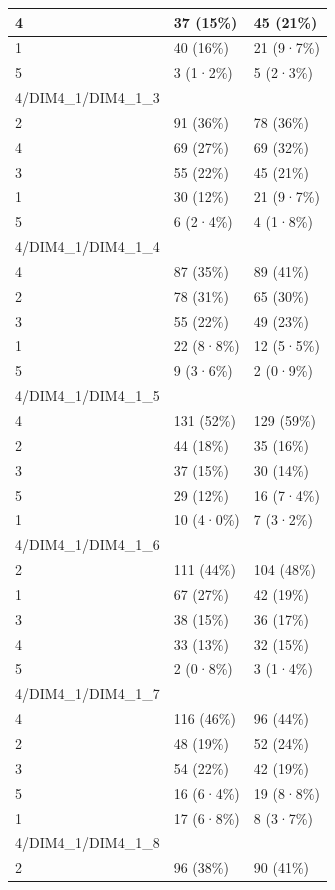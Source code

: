 \documentclass[
]{book}
\begin{document}
\begin{tabular}{l|l|l}
\hline
4 & 37 (15\%) & 45 (21\%)\\
\hline
1 & 40 (16\%) & 21 (9·7\%)\\
\hline
5 & 3 (1·2\%) & 5 (2·3\%)\\
\hline
4/DIM4\_1/DIM4\_1\_3 &  & \\
\hline
2 & 91 (36\%) & 78 (36\%)\\
\hline
4 & 69 (27\%) & 69 (32\%)\\
\hline
3 & 55 (22\%) & 45 (21\%)\\
\hline
1 & 30 (12\%) & 21 (9·7\%)\\
\hline
5 & 6 (2·4\%) & 4 (1·8\%)\\
\hline
4/DIM4\_1/DIM4\_1\_4 &  & \\
\hline
4 & 87 (35\%) & 89 (41\%)\\
\hline
2 & 78 (31\%) & 65 (30\%)\\
\hline
3 & 55 (22\%) & 49 (23\%)\\
\hline
1 & 22 (8·8\%) & 12 (5·5\%)\\
\hline
5 & 9 (3·6\%) & 2 (0·9\%)\\
\hline
4/DIM4\_1/DIM4\_1\_5 &  & \\
\hline
4 & 131 (52\%) & 129 (59\%)\\
\hline
2 & 44 (18\%) & 35 (16\%)\\
\hline
3 & 37 (15\%) & 30 (14\%)\\
\hline
5 & 29 (12\%) & 16 (7·4\%)\\
\hline
1 & 10 (4·0\%) & 7 (3·2\%)\\
\hline
4/DIM4\_1/DIM4\_1\_6 &  & \\
\hline
2 & 111 (44\%) & 104 (48\%)\\
\hline
1 & 67 (27\%) & 42 (19\%)\\
\hline
3 & 38 (15\%) & 36 (17\%)\\
\hline
4 & 33 (13\%) & 32 (15\%)\\
\hline
5 & 2 (0·8\%) & 3 (1·4\%)\\
\hline
4/DIM4\_1/DIM4\_1\_7 &  & \\
\hline
4 & 116 (46\%) & 96 (44\%)\\
\hline
2 & 48 (19\%) & 52 (24\%)\\
\hline
3 & 54 (22\%) & 42 (19\%)\\
\hline
5 & 16 (6·4\%) & 19 (8·8\%)\\
\hline
1 & 17 (6·8\%) & 8 (3·7\%)\\
\hline
4/DIM4\_1/DIM4\_1\_8 &  & \\
\hline
2 & 96 (38\%) & 90 (41\%)\\

\end{tabular}
\end{document}
